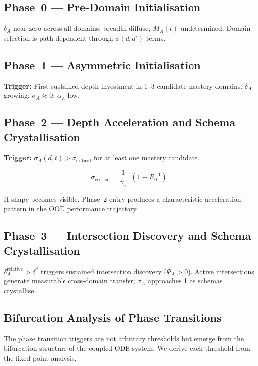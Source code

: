 \subsection*{Phase~0 --- Pre-Domain Initialisation}

$\delta_A$ near-zero across all domains; breadth diffuse; $M_A(t)$
undetermined. Domain selection is path-dependent through $\phi(d,d')$
terms.

\subsection*{Phase~1 --- Asymmetric Initialisation}

\textbf{Trigger:} First sustained depth investment in 1--3 candidate
mastery domains. $\delta_A$ growing; $\sigma_A \approx 0$; $\alpha_A$
low.

\subsection*{Phase~2 --- Depth Acceleration and Schema Crystallisation}

\textbf{Trigger:} $\sigma_A(d,t) > \sigma_{\text{critical}}$ for at
least one mastery candidate.

\begin{equation}\label{eq:sigma-critical}
\sigma_{\text{critical}} = \frac{1}{\gamma_\sigma} \cdot (1 - R_0^{-1})
\end{equation}

H-shape becomes visible. Phase~2 entry produces a characteristic
acceleration pattern in the OOD performance trajectory.

\subsection*{Phase~3 --- Intersection Discovery and Schema Crystallisation}

$\delta_A^{\text{relative}} > \delta^*$ triggers sustained intersection
discovery ($\Psi_A > 0$). Active intersections generate measurable
cross-domain transfer; $\sigma_A$ approaches 1 as schemas crystallise.

\subsection{Bifurcation Analysis of Phase Transitions}\label{sec:bifurcation}

The phase transition triggers are not arbitrary thresholds but emerge from
the bifurcation structure of the coupled ODE system. We derive each
threshold from the fixed-point analysis.

